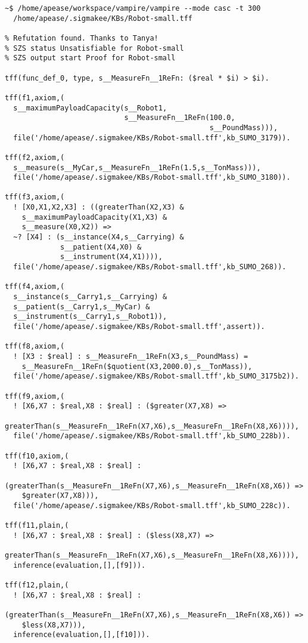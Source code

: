 \documentclass{article}
\begin{document}
\begin{verbatim}
~$ /home/apease/workspace/vampire/vampire --mode casc -t 300 
  /home/apease/.sigmakee/KBs/Robot-small.tff

% Refutation found. Thanks to Tanya!
% SZS status Unsatisfiable for Robot-small
% SZS output start Proof for Robot-small

tff(func_def_0, type, s__MeasureFn__1ReFn: ($real * $i) > $i).

tff(f1,axiom,(
  s__maximumPayloadCapacity(s__Robot1,
                            s__MeasureFn__1ReFn(100.0,
                                                s__PoundMass))),
  file('/home/apease/.sigmakee/KBs/Robot-small.tff',kb_SUMO_3179)).

tff(f2,axiom,(
  s__measure(s__MyCar,s__MeasureFn__1ReFn(1.5,s__TonMass))),
  file('/home/apease/.sigmakee/KBs/Robot-small.tff',kb_SUMO_3180)).

tff(f3,axiom,(
  ! [X0,X1,X2,X3] : ((greaterThan(X2,X3) & 
    s__maximumPayloadCapacity(X1,X3) & 
    s__measure(X0,X2)) => 
  ~? [X4] : (s__instance(X4,s__Carrying) & 
             s__patient(X4,X0) & 
             s__instrument(X4,X1)))),
  file('/home/apease/.sigmakee/KBs/Robot-small.tff',kb_SUMO_268)).

tff(f4,axiom,(
  s__instance(s__Carry1,s__Carrying) & 
  s__patient(s__Carry1,s__MyCar) & 
  s__instrument(s__Carry1,s__Robot1)),
  file('/home/apease/.sigmakee/KBs/Robot-small.tff',assert)).

tff(f8,axiom,(
  ! [X3 : $real] : s__MeasureFn__1ReFn(X3,s__PoundMass) = 
    s__MeasureFn__1ReFn($quotient(X3,2000.0),s__TonMass)),
  file('/home/apease/.sigmakee/KBs/Robot-small.tff',kb_SUMO_3175b2)).

tff(f9,axiom,(
  ! [X6,X7 : $real,X8 : $real] : ($greater(X7,X8) => 
    greaterThan(s__MeasureFn__1ReFn(X7,X6),s__MeasureFn__1ReFn(X8,X6)))),
  file('/home/apease/.sigmakee/KBs/Robot-small.tff',kb_SUMO_228b)).

tff(f10,axiom,(
  ! [X6,X7 : $real,X8 : $real] : 
    (greaterThan(s__MeasureFn__1ReFn(X7,X6),s__MeasureFn__1ReFn(X8,X6)) =>
    $greater(X7,X8))),
  file('/home/apease/.sigmakee/KBs/Robot-small.tff',kb_SUMO_228c)).

tff(f11,plain,(
  ! [X6,X7 : $real,X8 : $real] : ($less(X8,X7) => 
    greaterThan(s__MeasureFn__1ReFn(X7,X6),s__MeasureFn__1ReFn(X8,X6)))),
  inference(evaluation,[],[f9])).

tff(f12,plain,(
  ! [X6,X7 : $real,X8 : $real] : 
    (greaterThan(s__MeasureFn__1ReFn(X7,X6),s__MeasureFn__1ReFn(X8,X6)) => 
    $less(X8,X7))),
  inference(evaluation,[],[f10])).


\end{verbatim}
\end{document}
